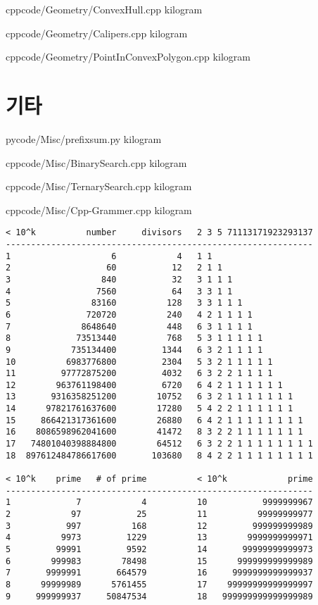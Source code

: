 \documentclass[landscape, 8pt, a4paper, twocolumn]{extarticle} %
\begin{document}
{}{}
{cpp}{code/Geometry/ConvexHull.cpp}
{kilogram}

{}{}
{cpp}{code/Geometry/Calipers.cpp}
{kilogram}

{}{}
{cpp}{code/Geometry/PointInConvexPolygon.cpp}
{kilogram}

\section{기타}

{}{}
{py}{code/Misc/prefixsum.py}
{kilogram}

{}{}
{cpp}{code/Misc/BinarySearch.cpp}
{kilogram}

{}{}
{cpp}{code/Misc/TernarySearch.cpp}
{kilogram}

{}{}
{cpp}{code/Misc/Cpp-Grammer.cpp}
{kilogram}

\begin{verbatim}
< 10^k          number     divisors   2 3 5 71113171923293137
-------------------------------------------------------------
1                    6            4   1 1
2                   60           12   2 1 1
3                  840           32   3 1 1 1
4                 7560           64   3 3 1 1
5                83160          128   3 3 1 1 1
6               720720          240   4 2 1 1 1 1
7              8648640          448   6 3 1 1 1 1
8             73513440          768   5 3 1 1 1 1 1
9            735134400         1344   6 3 2 1 1 1 1
10          6983776800         2304   5 3 2 1 1 1 1 1
11         97772875200         4032   6 3 2 2 1 1 1 1
12        963761198400         6720   6 4 2 1 1 1 1 1 1
13       9316358251200        10752   6 3 2 1 1 1 1 1 1 1
14      97821761637600        17280   5 4 2 2 1 1 1 1 1 1
15     866421317361600        26880   6 4 2 1 1 1 1 1 1 1 1
16    8086598962041600        41472   8 3 2 2 1 1 1 1 1 1 1
17   74801040398884800        64512   6 3 2 2 1 1 1 1 1 1 1 1
18  897612484786617600       103680   8 4 2 2 1 1 1 1 1 1 1 1

< 10^k    prime   # of prime          < 10^k            prime
-------------------------------------------------------------
1             7            4          10           9999999967
2            97           25          11          99999999977
3           997          168          12         999999999989
4          9973         1229          13        9999999999971
5         99991         9592          14       99999999999973
6        999983        78498          15      999999999999989
7       9999991       664579          16     9999999999999937
8      99999989      5761455          17    99999999999999997
9     999999937     50847534          18   999999999999999989
\end{verbatim}
\end{document}
